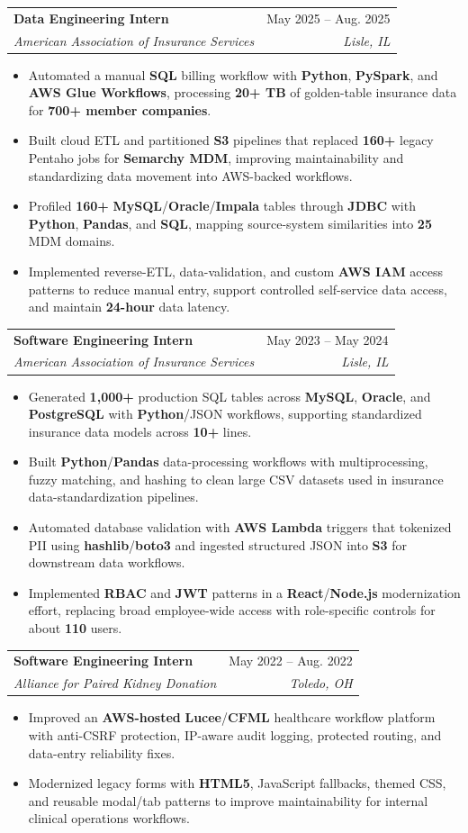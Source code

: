 \documentclass[letterpaper,11pt]{article}
\makeatletter
\newcommand{\resumeItem}[1]{
  \item\small{
    {#1 \vspace{-1pt}}
  }
}
\newcommand{\resumeSubheading}[4]{
  \vspace{-1pt}\item
    \begin{tabular*}{0.97\textwidth}[t]{l@{\extracolsep{\fill}}r}
      \textbf{#1} & #2 \\
      \textit{\small#3} & \textit{\small #4} \\
    \end{tabular*}\vspace{-3pt}
}
\newcommand{\resumeItemListStart}{\begin{itemize}[leftmargin=0.16in, itemsep=0pt, topsep=0pt, parsep=0pt]}
\newcommand{\resumeItemListEnd}{\end{itemize}\vspace{-4pt}}
\makeatother
\begin{document}
    \resumeSubheading
      {Data Engineering Intern}{May 2025 -- Aug. 2025}
      {American Association of Insurance Services}{Lisle, IL}
      \resumeItemListStart
        \resumeItem{Automated a manual \textbf{SQL} billing workflow with \textbf{Python}, \textbf{PySpark}, and \textbf{AWS Glue Workflows}, processing \textbf{20+ TB} of golden-table insurance data for \textbf{700+ member companies}.}
        \resumeItem{Built cloud ETL and partitioned \textbf{S3} pipelines that replaced \textbf{160+} legacy Pentaho jobs for \textbf{Semarchy MDM}, improving maintainability and standardizing data movement into AWS-backed workflows.}
        \resumeItem{Profiled \textbf{160+} \textbf{MySQL}/\textbf{Oracle}/\textbf{Impala} tables through \textbf{JDBC} with \textbf{Python}, \textbf{Pandas}, and \textbf{SQL}, mapping source-system similarities into \textbf{25} MDM domains.}
        \resumeItem{Implemented reverse-ETL, data-validation, and custom \textbf{AWS IAM} access patterns to reduce manual entry, support controlled self-service data access, and maintain \textbf{24-hour} data latency.}
      \resumeItemListEnd

    \resumeSubheading
      {Software Engineering Intern}{May 2023 -- May 2024}
      {American Association of Insurance Services}{Lisle, IL}
      \resumeItemListStart
        \resumeItem{Generated \textbf{1,000+} production SQL tables across \textbf{MySQL}, \textbf{Oracle}, and \textbf{PostgreSQL} with \textbf{Python}/JSON workflows, supporting standardized insurance data models across \textbf{10+} lines.}
        \resumeItem{Built \textbf{Python}/\textbf{Pandas} data-processing workflows with multiprocessing, fuzzy matching, and hashing to clean large CSV datasets used in insurance data-standardization pipelines.}
        \resumeItem{Automated database validation with \textbf{AWS Lambda} triggers that tokenized PII using \textbf{hashlib}/\textbf{boto3} and ingested structured JSON into \textbf{S3} for downstream data workflows.}
        \resumeItem{Implemented \textbf{RBAC} and \textbf{JWT} patterns in a \textbf{React}/\textbf{Node.js} modernization effort, replacing broad employee-wide access with role-specific controls for about \textbf{110} users.}
      \resumeItemListEnd

    \resumeSubheading
      {Software Engineering Intern}{May 2022 -- Aug. 2022}
      {Alliance for Paired Kidney Donation}{Toledo, OH}
      \resumeItemListStart
        \resumeItem{Improved an \textbf{AWS-hosted} \textbf{Lucee}/\textbf{CFML} healthcare workflow platform with anti-CSRF protection, IP-aware audit logging, protected routing, and data-entry reliability fixes.}
        \resumeItem{Modernized legacy forms with \textbf{HTML5}, JavaScript fallbacks, themed CSS, and reusable modal/tab patterns to improve maintainability for internal clinical operations workflows.}
      \resumeItemListEnd
\end{document}
